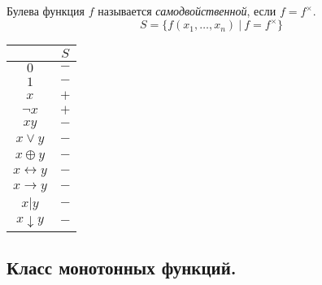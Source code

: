 \begin{definition}
    Булева функция $f$ называется \emph{самодвойственной}, если $f = f^\times$.
    \[
        S = \{f(x_1,\ldots,x_n) \ \big| \ f = f^\times\}
    \]

    \begin{center}
        \begin{tabular}{c | c}
                                  & $S$ \\ [0.5ex]
            \hline
            $0$                   & $-$ \\
            $1$                   & $-$ \\
            $x$                   & $+$ \\
            $\lnot x$             & $+$ \\
            $xy$                  & $-$ \\
            $x\lor y$             & $-$ \\
            $x \oplus y$          & $-$ \\
            $x \leftrightarrow y$ & $-$ \\
            $x \rightarrow y$     & $-$ \\
            $x \vert y$           & $-$ \\
            $x \downarrow y$      & $-$ \\
        \end{tabular}
        \label{table:5}
    \end{center}
\end{definition}

\subsection{Класс монотонных функций.}

